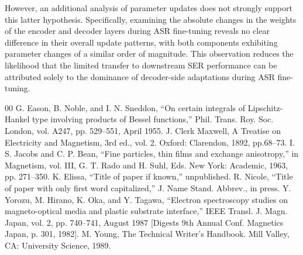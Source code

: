 \documentclass[conference]{IEEEtran}
\begin{document}
However, an additional analysis of parameter updates does not strongly support this latter hypothesis. Specifically, examining the absolute changes in the weights of the encoder and decoder layers during ASR fine-tuning reveals no clear difference in their overall update patterns, with both components exhibiting parameter changes of a similar order of magnitude. This observation reduces the likelihood that the limited transfer to downstream SER performance can be attributed solely to the dominance of decoder-side adaptations during ASR fine-tuning.

\begin{thebibliography}{00}
 G. Eason, B. Noble, and I. N. Sneddon, ``On certain integrals of Lipschitz-Hankel type involving products of Bessel functions,'' Phil. Trans. Roy. Soc. London, vol. A247, pp. 529--551, April 1955.
 J. Clerk Maxwell, A Treatise on Electricity and Magnetism, 3rd ed., vol. 2. Oxford: Clarendon, 1892, pp.68--73.
 I. S. Jacobs and C. P. Bean, ``Fine particles, thin films and exchange anisotropy,'' in Magnetism, vol. III, G. T. Rado and H. Suhl, Eds. New York: Academic, 1963, pp. 271--350.
 K. Elissa, ``Title of paper if known,'' unpublished.
 R. Nicole, ``Title of paper with only first word capitalized,'' J. Name Stand. Abbrev., in press.
 Y. Yorozu, M. Hirano, K. Oka, and Y. Tagawa, ``Electron spectroscopy studies on magneto-optical media and plastic substrate interface,'' IEEE Transl. J. Magn. Japan, vol. 2, pp. 740--741, August 1987 [Digests 9th Annual Conf. Magnetics Japan, p. 301, 1982].
 M. Young, The Technical Writer's Handbook. Mill Valley, CA: University Science, 1989.
\end{thebibliography}
\end{document}
